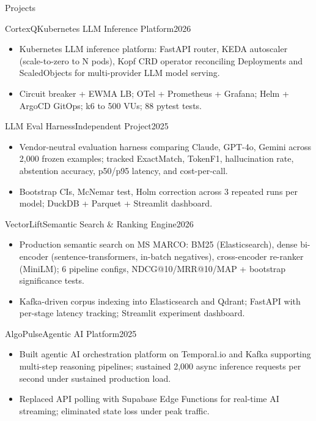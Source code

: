 \documentclass[]{mcdowellcv}
\begin{document}
\begin{cvsection}{Projects}
  \begin{cvsubsection}{CortexQ}{Kubernetes LLM Inference Platform}{2026}
    \begin{itemize}
      \item Kubernetes LLM inference platform: FastAPI router, KEDA autoscaler (scale-to-zero to N pods), Kopf CRD operator reconciling Deployments and ScaledObjects for multi-provider LLM model serving.
      \item Circuit breaker + EWMA LB; OTel + Prometheus + Grafana; Helm + ArgoCD GitOps; k6 to 500 VUs; 88 pytest tests.
    \end{itemize}
    \vspace{-1.5pt}
  \end{cvsubsection}

  \begin{cvsubsection}{LLM Eval Harness}{Independent Project}{2025}
    \begin{itemize}
      \item Vendor-neutral evaluation harness comparing Claude, GPT-4o, Gemini across 2,000 frozen examples; tracked ExactMatch, TokenF1, hallucination rate, abstention accuracy, p50/p95 latency, and cost-per-call.
      \item Bootstrap CIs, McNemar test, Holm correction across 3 repeated runs per model; DuckDB + Parquet + Streamlit dashboard.
    \end{itemize}
    \vspace{-1.5pt}
  \end{cvsubsection}

  \begin{cvsubsection}{VectorLift}{Semantic Search \& Ranking Engine}{2026}
    \begin{itemize}
      \item Production semantic search on MS MARCO: BM25 (Elasticsearch), dense bi-encoder (sentence-transformers, in-batch negatives), cross-encoder re-ranker (MiniLM); 6 pipeline configs, NDCG@10/MRR@10/MAP + bootstrap significance tests.
      \item Kafka-driven corpus indexing into Elasticsearch and Qdrant; FastAPI with per-stage latency tracking; Streamlit experiment dashboard.
    \end{itemize}
    \vspace{-1.5pt}
  \end{cvsubsection}

  \begin{cvsubsection}{AlgoPulse}{Agentic AI Platform}{2025}
    \begin{itemize}
      \item Built agentic AI orchestration platform on Temporal.io and Kafka supporting multi-step reasoning pipelines; sustained 2,000 async inference requests per second under sustained production load.
      \item Replaced API polling with Supabase Edge Functions for real-time AI streaming; eliminated state loss under peak traffic.
    \end{itemize}
  \end{cvsubsection}
\end{cvsection}
\end{document}
